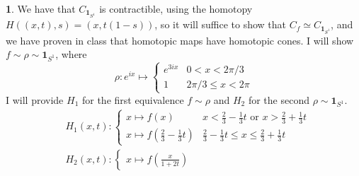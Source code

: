 \documentclass[10.5pt]{article}
\theoremstyle{definition}
\newtheorem{pb}{}
\newcommand{\tor}{\text{ or }}
\newcommand{\ism}{\simeq}
\begin{document}
\begin{pb}
        We have that \(C_{\mathbf{1}_{S^1}}\) is contractible, using the homotopy \(H((x,t),s) = (x,t(1-s))\), so it will suffice to show that \(C_{f} \ism C_{\mathbf{1}_{S^1}}\), and we 
        have proven in class that homotopic maps have homotopic cones. I will show \(f \sim \rho \sim \mathbf{1}_{S^1}\), where \[\rho: e^{ix} \mapsto 
        \begin{cases} 
        e^{3ix} & 0 < x < 2\pi/3 \\ 
        1 & 2\pi/3 \leq x < 2\pi
        \end{cases}\]
        I will provide \(H_1\) for the first equivalence \(f \sim \rho\) and \(H_2\) for the second \(\rho \sim \mathbf{1}_{S^1}\).
        \begin{align*}
            &H_1(x,t):
            \begin{cases}
                x \mapsto f(x) & x < \frac{2}{3} - \frac{1}{3}t \tor x > \frac{2}{3} + \frac{1}{3}t \\ 
                x \mapsto f(\frac{2}{3} - \frac{1}{3}t) & \frac{2}{3} - \frac{1}{3}t \leq x \leq \frac{2}{3} + \frac{1}{3}t
            \end{cases} \\
            &H_2(x,t):
            \begin{cases}
                x \mapsto f(\frac{x}{1 + 2t})
            \end{cases}
        \end{align*}
    \end{pb}
\end{document}
